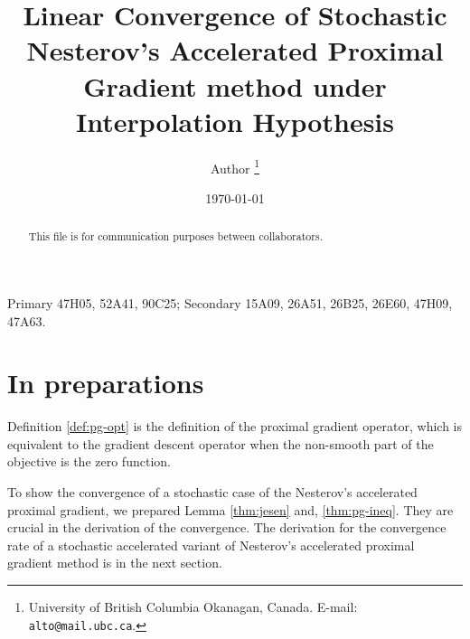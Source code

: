 \documentclass[12pt]{article}
\begin{document}
\title{{\selectfont Linear Convergence of Stochastic Nesterov's Accelerated Proximal Gradient method under Interpolation Hypothesis}}

\author{
    Author
    \thanks{
        University of British Columbia Okanagan,
        Canada. E-mail: \texttt{alto@mail.ubc.ca}.
    }
}

\date{\today}

\maketitle
{}

\begin{abstract} 
    This file is for communication purposes between collaborators. 

\end{abstract}

Primary 47H05, 52A41, 90C25; Secondary 15A09, 26A51, 26B25, 26E60, 47H09, 47A63.


\section{In preparations}
    Definition \ref{def:pg-opt} is the definition of the proximal gradient operator, which is equivalent to the gradient descent operator when the non-smooth part of the objective is the zero function. 
    \par
    To show the convergence of a stochastic case of the Nesterov's accelerated proximal gradient, we prepared Lemma \ref{thm:jesen} and, \ref{thm:pg-ineq}. 
    They are crucial in the derivation of the convergence. 
    The derivation for the convergence rate of a stochastic accelerated variant of Nesterov's accelerated  proximal gradient method is in the next section. 
\end{document}
